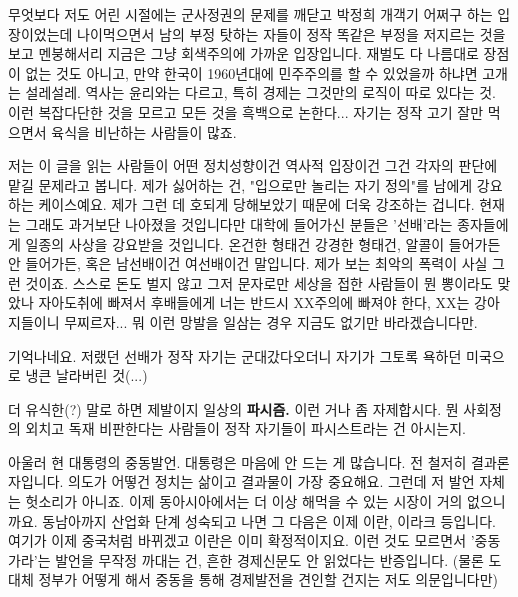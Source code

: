 무엇보다 저도 어린 시절에는 군사정권의 문제를 깨닫고 박정희 개객기 어쩌구 하는 입장이었는데
나이먹으면서 남의 부정 탓하는 자들이 정작 똑같은 부정을 저지르는 것을 보고 멘붕해서리 지금은 그냥 회색주의에 가까운 입장입니다.
재벌도 다 나름대로 장점이 없는 것도 아니고, 만약 한국이 1960년대에 민주주의를 할 수 있었을까 하냐면 고개는 설레설레.
역사는 윤리와는 다르고, 특히 경제는 그것만의 로직이 따로 있다는 것.
이런 복잡다단한 것을 모르고 모든 것을 흑백으로 논한다...
자기는 정작 고기 잘만 먹으면서 육식을 비난하는 사람들이 많죠.
\vspace{5mm}

저는 이 글을 읽는 사람들이 어떤 정치성향이건 역사적 입장이건 그건 각자의 판단에 맡길 문제라고 봅니다.
제가 싫어하는 건, "입으로만 놀리는 자기 정의"를 남에게 강요하는 케이스예요. 제가 그런 데 호되게 당해보았기 때문에 더욱 강조하는 겁니다.
현재는 그래도 과거보단 나아졌을 것입니다만 대학에 들어가신 분들은 '선배'라는 종자들에게 일종의 사상을 강요받을 것입니다.
온건한 형태건 강경한 형태건, 알콜이 들어가든 안 들어가든, 혹은 남선배이건 여선배이건 말입니다.
제가 보는 최악의 폭력이 사실 그런 것이죠.
스스로 돈도 벌지 않고 그저 문자로만 세상을 접한 사람들이 뭔 뽕이라도 맞았나 자아도취에 빠져서
후배들에게 너는 반드시 XX주의에 빠져야 한다, XX는 강아지들이니 무찌르자... 뭐 이런 망발을 일삼는 경우 지금도 없기만 바라겠습니다만.
\vspace{5mm}

기억나네요. 저랬던 선배가 정작 자기는 군대갔다오더니 자기가 그토록 욕하던 미국으로 냉큰 날라버린 것(...)
\vspace{5mm}

더 유식한(?) 말로 하면 제발이지 일상의 \textbf{파시즘.} 이런 거나 좀 자제합시다.
뭔 사회정의 외치고 독재 비판한다는 사람들이 정작 자기들이 파시스트라는 건 아시는지.
\vspace{5mm}

아울러 현 대통령의 중동발언.
대통령은 마음에 안 드는 게 많습니다. 전 철저히 결과론자입니다. 의도가 어떻건 정치는 삶이고 결과물이 가장 중요해요.
그런데 저 발언 자체는 헛소리가 아니죠. 이제 동아시아에서는 더 이상 해먹을 수 있는 시장이 거의 없으니까요.
동남아까지 산업화 단계 성숙되고 나면 그 다음은 이제 이란, 이라크 등입니다. 여기가 이제 중국처럼 바뀌겠고 이란은 이미 확정적이지요.
이런 것도 모르면서 '중동 가라'는 발언을 무작정 까대는 건, 흔한 경제신문도 안 읽었다는 반증입니다.
(물론 도대체 정부가 어떻게 해서 중동을 통해 경제발전을 견인할 건지는 저도 의문입니다만)
\vspace{5mm}






